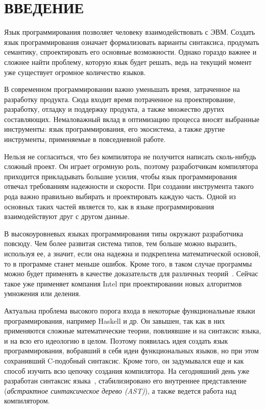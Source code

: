\chapter*{ВВЕДЕНИЕ}\label{ch:introduction}


Язык программирования позволяет человеку взаимодействовать с ЭВМ.
Создать язык программирования означает формализовать варианты синтаксиса, продумать семантику, спроектировать его основные возможности.
Однако гораздо важнее и сложнее найти проблему, которую язык будет решать, ведь на текущий момент уже существует огромное количество языков.

В современном программировании важно уменьшать время, затраченное на разработку продукта.
Сюда входит время потраченное на проектирование, разработку, отладку и поддержку продукта, а также множество других составляющих.
Немаловажный вклад в оптимизацию процесса вносят выбранные инструменты: язык программирования, его экосистема, а также другие инструменты, применяемые в повседневной работе.

Нельзя не согласиться, что без компилятора не получится написать сколь-нибудь сложный проект.
Он играет огромную роль, поэтому разработчикам компилятора приходится прикладывать большие усилия, чтобы язык программирования отвечал требованиям надежности и скорости.
При создании инструмента такого рода важно правильно выбирать и проектировать каждую часть.
Одной из основных таких частей является то, как в языке программирования взаимодействуют друг с другом данные.


В высокоуровневых языках программирования типы окружают разработчика повсюду.
Чем более развитая система типов, тем больше можно выразить, используя ее, а значит, если она надежна и подкреплена математической основой, то в программе станет меньше ошибок.
Кроме того, в таком случае программы можно будет применять в качестве доказательств для различных теорий~\cite{AutoProvement}.
Сейчас такое уже применяет компания Intel при проектировании новых алгоритмов умножения или деления.

Актуальна проблема высокого порога входа в некоторые функциональные языки программирования, например Haskell и др.
Он завышен, так как в них применяются сложные математические теории, повлиявшие и на синтаксис языка, и на всю его идеологию в целом.
Поэтому появилась идея создать язык программирования, вобравший в себя идеи функциональных языков, но при этом сохранивший C-подобный синтаксис.
Кроме того, он задумывался еще и как способ изучить всю цепочку создания компилятора.
На сегодняшний день уже разработан синтаксис языка~, стабилизировано его внутреннее представление (\textit{абстрактное синтаксическое дерево (AST)}), а также ведется работа над компилятором.

